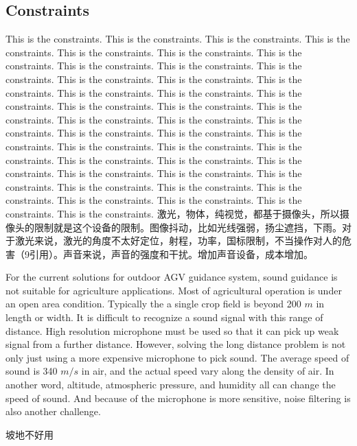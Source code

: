 \documentclass[12pt]{article}
\begin{document}
\begin{flushleft}
\subsection{Constraints}
This is the constraints. This is the constraints. This is the constraints. This is the constraints. This is the constraints. This is the constraints. This is the constraints. This is the constraints. This is the constraints. This is the constraints. This is the constraints. This is the constraints. This is the constraints. This is the constraints. This is the constraints. This is the constraints. This is the constraints. This is the constraints. This is the constraints. This is the constraints. This is the constraints. This is the constraints. This is the constraints. This is the constraints. This is the constraints. This is the constraints. This is the constraints. This is the constraints. This is the constraints. This is the constraints. This is the constraints. This is the constraints. This is the constraints. This is the constraints. This is the constraints. This is the constraints. This is the constraints. \cite{vis2006survey} This is the constraints. This is the constraints. This is the constraints. This is the constraints. 
激光，物体，纯视觉，都基于摄像头，所以摄像头的限制就是这个设备的限制。图像抖动，比如光线强弱，扬尘遮挡，下雨。对于激光来说，激光的角度不太好定位，射程，功率，国标限制，不当操作对人的危害（9引用）。声音来说，声音的强度和干扰。增加声音设备，成本增加。

For the current solutions for outdoor AGV guidance system, sound guidance is not suitable for agriculture applications. Most of agricultural operation is under an open area condition. Typically the a single crop field is beyond 200 $m$ in length or width. It is difficult to recognize a sound signal with this range of distance.  High resolution microphone must be used so that it can pick up weak signal from a further distance. However, solving the long distance problem is not only just using a more expensive microphone to pick sound. The average speed of sound is 340 $m/s$ in air, and the actual speed vary along the density of air. In another word, altitude, atmospheric pressure, and humidity all can change the speed of sound. And because of the microphone is more sensitive, noise filtering is also another challenge.

坡地不好用


\end{flushleft}
\end{document}
